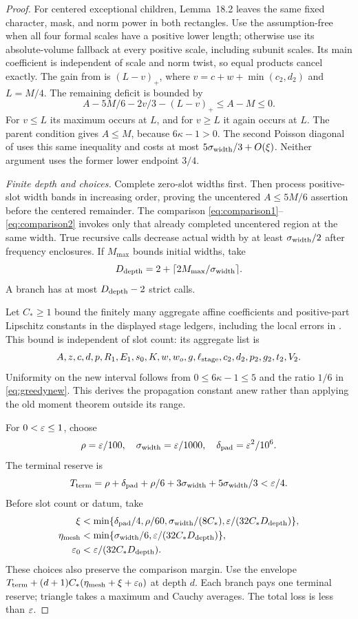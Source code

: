 \begin{proof}
For centered exceptional children, Lemma~18.2 leaves the same fixed character, mask, and norm power in both rectangles. Use the assumption-free  when all four formal scales have a positive lower length; otherwise use its absolute-volume fallback at every positive scale, including subunit scales. Its main coefficient is independent of scale and norm twist, so equal products cancel exactly. The gain from  is $(L-v)_+$, where $v=c+w+\min(c_2,d_2)$ and $L=M/4$. The remaining deficit is bounded by
\[
 A-5M/6-2v/3-(L-v)_+\le A-M\le0.
\]
For $v\le L$ its maximum occurs at $L$, and for $v\ge L$ it again occurs at $L$. The parent condition gives $A\le M$, because $6\kappa-1>0$. The second Poisson diagonal of  uses this same inequality and costs at most $5\sigma_{\rm width}/3+O(\xi)$. Neither argument uses the former lower endpoint $3/4$.

\emph{Finite depth and choices.}
Complete zero-slot widths first. Then process positive-slot width bands in increasing order, proving the uncentered $A\le5M/6$ assertion before the centered remainder. The comparison \eqref{eq:comparison1}--\eqref{eq:comparison2} invokes only that already completed uncentered region at the same width. True recursive calls decrease actual width by at least $\sigma_{\rm width}/2$ after frequency enclosures. If $M_{\max}$ bounds initial widths, take
\[
 D_{\rm depth}=2+\lceil2M_{\max}/\sigma_{\rm width}\rceil.
\]
A branch has at most $D_{\rm depth}-2$ strict calls.

Let $C_*\ge1$ bound the finitely many aggregate affine coefficients and positive-part Lipschitz constants in the displayed stage ledgers, including the local errors in . This bound is independent of slot count: its aggregate list is
\[
 A,z,c,d,p,R_1,E_1,s_0,K,w,w_o,g,\ell_{\rm stage},
 c_2,d_2,p_2,g_2,t_2,V_2.
\]
Uniformity on the new interval follows from $0\le6\kappa-1\le5$ and the ratio $1/6$ in \eqref{eq:greedynew}. This derives the propagation constant anew rather than applying the old moment theorem outside its range.

For $0<\varepsilon\le1$, choose
\[
 \rho=\varepsilon/100,\quad \sigma_{\rm width}=\varepsilon/1000,\quad
 \delta_{\rm pad}=\varepsilon^2/10^6.
\]
The terminal reserve is
\[
 T_{\rm term}=\rho+\delta_{\rm pad}+\rho/6+
                3\sigma_{\rm width}+5\sigma_{\rm width}/3<\varepsilon/4.
\]
Before slot count or datum, take
\begin{align*}
 \xi&<\min\{\delta_{\rm pad}/4,\rho/60,\sigma_{\rm width}/(8C_*),
                             \varepsilon/(32C_*D_{\rm depth})\},\\
 \eta_{\rm mesh}&<\min\{\sigma_{\rm width}/6,\varepsilon/(32C_*D_{\rm depth})\},\\
 \varepsilon_0&<\varepsilon/(32C_*D_{\rm depth}).
\end{align*}
These choices also preserve the comparison margin. Use the envelope
$T_{\rm term}+(d+1)C_*(\eta_{\rm mesh}+\xi+\varepsilon_0)$ at depth $d$. Each branch pays one terminal reserve; triangle takes a maximum and Cauchy averages. The total loss is less than $\varepsilon$.


\end{proof}
